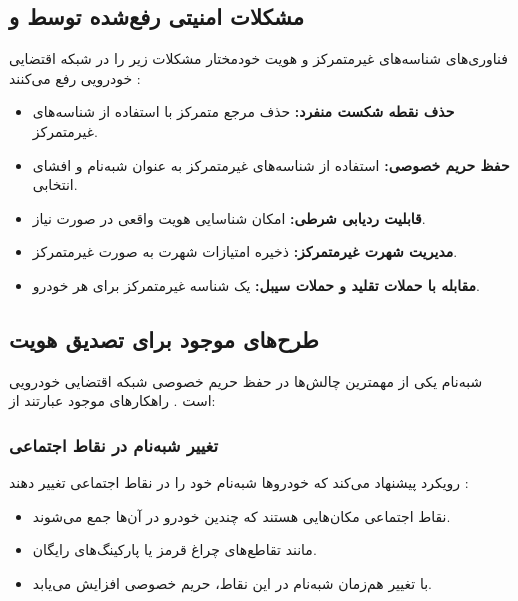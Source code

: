 \documentclass[12pt,a4paper]{article}
\begin{document}
\subsection{مشکلات امنیتی رفع‌شده توسط  و }

فناوری‌های شناسه‌های غیرمتمرکز و هویت خودمختار مشکلات زیر را در شبکه اقتضایی خودرویی رفع می‌کنند \cite{mazzocca2025survey, feraudoDIVADIDbasedReputation2024}:

\begin{itemize}
  \item \textbf{حذف نقطه شکست منفرد:} حذف مرجع متمرکز با استفاده از شناسه‌های غیرمتمرکز.
  \item \textbf{حفظ حریم خصوصی:} استفاده از شناسه‌های غیرمتمرکز به عنوان شبه‌نام و افشای انتخابی.
  \item \textbf{قابلیت ردیابی شرطی:} امکان شناسایی هویت واقعی در صورت نیاز.
  \item \textbf{مدیریت شهرت غیرمتمرکز:} ذخیره امتیازات شهرت به صورت غیرمتمرکز.
  \item \textbf{مقابله با حملات تقلید و حملات سیبل:} یک شناسه غیرمتمرکز برای هر خودرو.
\end{itemize}

\subsection{طرح‌های موجود برای تصدیق هویت}

شبه‌نام یکی از مهمترین چالش‌ها در حفظ حریم خصوصی شبکه اقتضایی خودرویی است \cite{luPseudonymChangingSocial2012, al-aniPrivacySafetyImprovement2023, rahmawatiagustinaSystematicLiteratureReview2025}. راهکارهای موجود عبارتند از:

\subsubsection{تغییر شبه‌نام در نقاط اجتماعی }

رویکرد  پیشنهاد می‌کند که خودروها شبه‌نام خود را در نقاط اجتماعی تغییر دهند \cite{luPseudonymChangingSocial2012}:

\begin{itemize}
  \item نقاط اجتماعی مکان‌هایی هستند که چندین خودرو در آن‌ها جمع می‌شوند.
  \item مانند تقاطع‌های چراغ قرمز یا پارکینگ‌های رایگان.
  \item با تغییر هم‌زمان شبه‌نام در این نقاط، حریم خصوصی افزایش می‌یابد.
\end{itemize}
\end{document}
